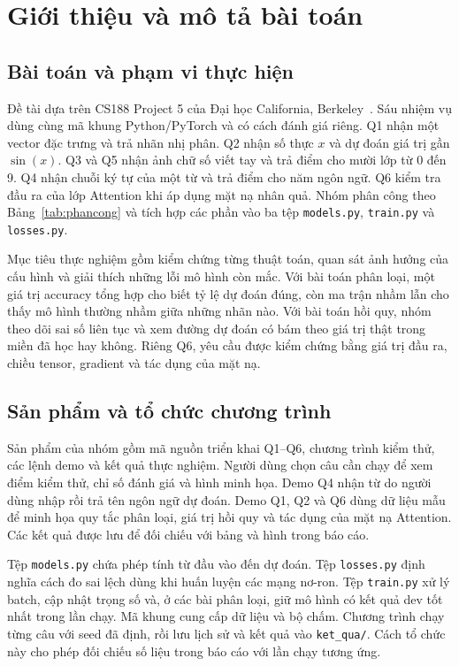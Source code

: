 \documentclass[conference]{IEEEtran}
\begin{document}
\section{Giới thiệu và mô tả bài toán}
\subsection{Bài toán và phạm vi thực hiện}
Đề tài dựa trên CS188 Project 5 của Đại học California, Berkeley~\cite{berkeley}. Sáu nhiệm vụ dùng cùng mã khung Python/PyTorch và có cách đánh giá riêng. Q1 nhận một vector đặc trưng và trả nhãn nhị phân. Q2 nhận số thực \(x\) và dự đoán giá trị gần \(\sin(x)\). Q3 và Q5 nhận ảnh chữ số viết tay và trả điểm cho mười lớp từ 0 đến 9. Q4 nhận chuỗi ký tự của một từ và trả điểm cho năm ngôn ngữ. Q6 kiểm tra đầu ra của lớp Attention khi áp dụng mặt nạ nhân quả. Nhóm phân công theo Bảng~\ref{tab:phancong} và tích hợp các phần vào ba tệp \texttt{models.py}, \texttt{train.py} và \texttt{losses.py}.

Mục tiêu thực nghiệm gồm kiểm chứng từng thuật toán, quan sát ảnh hưởng của cấu hình và giải thích những lỗi mô hình còn mắc. Với bài toán phân loại, một giá trị accuracy tổng hợp cho biết tỷ lệ dự đoán đúng, còn ma trận nhầm lẫn cho thấy mô hình thường nhầm giữa những nhãn nào. Với bài toán hồi quy, nhóm theo dõi sai số liên tục và xem đường dự đoán có bám theo giá trị thật trong miền đã học hay không. Riêng Q6, yêu cầu được kiểm chứng bằng giá trị đầu ra, chiều tensor, gradient và tác dụng của mặt nạ.

\subsection{Sản phẩm và tổ chức chương trình}
Sản phẩm của nhóm gồm mã nguồn triển khai Q1--Q6, chương trình kiểm thử, các lệnh demo và kết quả thực nghiệm. Người dùng chọn câu cần chạy để xem điểm kiểm thử, chỉ số đánh giá và hình minh họa. Demo Q4 nhận từ do người dùng nhập rồi trả tên ngôn ngữ dự đoán. Demo Q1, Q2 và Q6 dùng dữ liệu mẫu để minh họa quy tắc phân loại, giá trị hồi quy và tác dụng của mặt nạ Attention. Các kết quả được lưu để đối chiếu với bảng và hình trong báo cáo.

Tệp \texttt{models.py} chứa phép tính từ đầu vào đến dự đoán. Tệp \texttt{losses.py} định nghĩa cách đo sai lệch dùng khi huấn luyện các mạng nơ-ron. Tệp \texttt{train.py} xử lý batch, cập nhật trọng số và, ở các bài phân loại, giữ mô hình có kết quả dev tốt nhất trong lần chạy. Mã khung cung cấp dữ liệu và bộ chấm. Chương trình  chạy từng câu với seed đã định, rồi lưu lịch sử và kết quả vào \texttt{ket\_qua/}. Cách tổ chức này cho phép đối chiếu số liệu trong báo cáo với lần chạy tương ứng.
\end{document}
